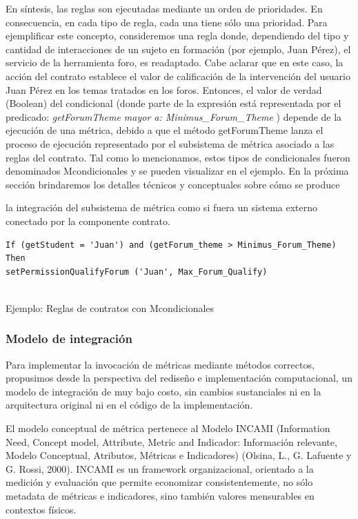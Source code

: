 \begin{itemize}
En síntesis, las reglas son ejecutadas mediante un orden de prioridades. En
consecuencia, en cada tipo de regla, cada una tiene sólo una prioridad.
Para ejemplificar este concepto, consideremos una regla donde, dependiendo
del tipo y cantidad de interacciones de un sujeto en formación (por
ejemplo, Juan Pérez), el servicio de la herramienta foro, es readaptado. Cabe
aclarar que en este caso, la acción del contrato establece el valor de calificación
de la intervención del usuario Juan Pérez en los temas tratados en los
foros. Entonces, el valor de verdad (Boolean) del condicional (donde parte de
la expresión está representada por el predicado: \textit{getForumTheme mayor a:
Minimus\_Forum\_Theme} ) depende de la ejecución de una métrica, debido a
que el método getForumTheme lanza el proceso de ejecución representado por
el subsistema de métrica asociado a las reglas del contrato.
Tal como lo mencionamos, estos tipos de condicionales fueron denominados
Mcondicionales y se pueden visualizar en el ejemplo. En la próxima sección
brindaremos los detalles técnicos y conceptuales sobre cómo se produce

la integración del subsistema de métrica como si fuera un sistema externo
conectado por la componente contrato.


\begin{lstlisting}[languaje=Java]
If (getStudent = 'Juan') and (getForum_theme > Minimus_Forum_Theme)
Then
setPermissionQualifyForum ('Juan', Max_Forum_Qualify)
    
\end{lstlisting}



\caption {Ejemplo: Reglas de contratos con Mcondicionales}


\subsubsection {Modelo de integración}

Para implementar la invocación de métricas mediante métodos correctos, propusimos
desde la perspectiva del rediseño e implementación computacional,
un modelo de integración de muy bajo costo, sin cambios sustanciales ni en la
arquitectura original ni en el código de la implementación.

El modelo conceptual de métrica pertenece al Modelo INCAMI (Information Need, Concept model, Attribute, Metric and Indicador: Información relevante, Modelo Conceptual, Atributos, Métricas e Indicadores) (Olsina, L., G. Lafuente y G. Rossi, 2000). INCAMI es un framework organizacional, orientado a la medición y evaluación que permite economizar consistentemente, no sólo metadata de métricas e indicadores, sino también valores mensurables en contextos físicos.



\end{itemize}
